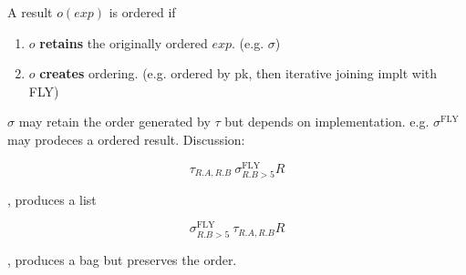 \documentclass[a4paper]{report}
\begin{document}
\begin{enumerate}
A result $o(exp)$ is ordered if
\begin{enumerate}
\item $o$ \textbf{retains} the originally ordered $exp$. (e.g. $\sigma$)
\item $o$ \textbf{creates} ordering. (e.g. ordered by pk, then iterative joining implt with FLY)
\end{enumerate}
$\sigma$ may retain the order generated by $\tau$ but depends on implementation. e.g. $\sigma^\text{FLY}$ may prodeces a ordered result. Discussion: 

$$
\tau_{R.A, R.B}\ \sigma_{R.B>5}^\text{FLY} R
$$
\begin{flushright}, produces a list\end{flushright}
$$
\sigma^\text{FLY}_{R.B>5}\ \tau_{R.A, R.B} R 
$$
\begin{flushright}, produces a bag but preserves the order.\end{flushright} 
\end{enumerate}
\end{document}
